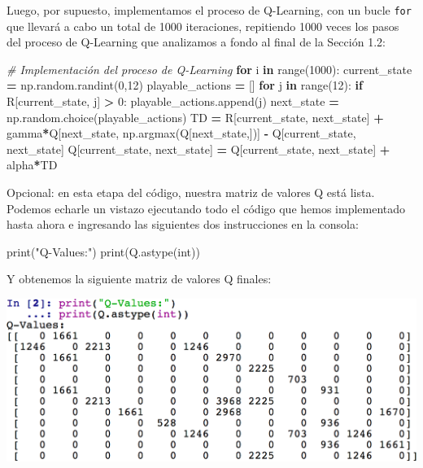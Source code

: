 \documentclass[
]{book}
\newenvironment{Shaded}{\begin{snugshade}}{\end{snugshade}}
\newcommand{\BuiltInTok}[1]{#1}
\newcommand{\CommentTok}[1]{\textcolor[rgb]{0.56,0.35,0.01}{\textit{#1}}}
\newcommand{\ControlFlowTok}[1]{\textcolor[rgb]{0.13,0.29,0.53}{\textbf{#1}}}
\newcommand{\DecValTok}[1]{\textcolor[rgb]{0.00,0.00,0.81}{#1}}
\newcommand{\KeywordTok}[1]{\textcolor[rgb]{0.13,0.29,0.53}{\textbf{#1}}}
\newcommand{\NormalTok}[1]{#1}
\newcommand{\OperatorTok}[1]{\textcolor[rgb]{0.81,0.36,0.00}{\textbf{#1}}}
\newcommand{\StringTok}[1]{\textcolor[rgb]{0.31,0.60,0.02}{#1}}
\begin{document}
Luego, por supuesto, implementamos el proceso de Q-Learning, con un bucle \texttt{for} que llevará a cabo un total de 1000 iteraciones, repitiendo 1000 veces los pasos del proceso de Q-Learning que analizamos a fondo al final de la Sección 1.2:

\begin{Shaded}
\begin{Highlighting}[]
\CommentTok{\# Implementación del proceso de Q{-}Learning}
\ControlFlowTok{for}\NormalTok{ i }\KeywordTok{in} \BuiltInTok{range}\NormalTok{(}\DecValTok{1000}\NormalTok{):}
\NormalTok{    current\_state }\OperatorTok{=}\NormalTok{ np.random.randint(}\DecValTok{0}\NormalTok{,}\DecValTok{12}\NormalTok{)}
\NormalTok{    playable\_actions }\OperatorTok{=}\NormalTok{ []}
    \ControlFlowTok{for}\NormalTok{ j }\KeywordTok{in} \BuiltInTok{range}\NormalTok{(}\DecValTok{12}\NormalTok{):}
        \ControlFlowTok{if}\NormalTok{ R[current\_state, j] }\OperatorTok{\textgreater{}} \DecValTok{0}\NormalTok{:}
\NormalTok{            playable\_actions.append(j)}
\NormalTok{    next\_state }\OperatorTok{=}\NormalTok{ np.random.choice(playable\_actions)}
\NormalTok{    TD }\OperatorTok{=}\NormalTok{ R[current\_state, next\_state] }\OperatorTok{+} 
\NormalTok{         gamma}\OperatorTok{*}\NormalTok{Q[next\_state, np.argmax(Q[next\_state,])] }\OperatorTok{{-}} 
\NormalTok{         Q[current\_state, next\_state]}
\NormalTok{    Q[current\_state, next\_state] }\OperatorTok{=}\NormalTok{ Q[current\_state, next\_state] }\OperatorTok{+}\NormalTok{ alpha}\OperatorTok{*}\NormalTok{TD}
\end{Highlighting}
\end{Shaded}

Opcional: en esta etapa del código, nuestra matriz de valores Q está lista. Podemos echarle un vistazo ejecutando todo el código que hemos implementado hasta ahora e ingresando las siguientes dos instrucciones en la consola:

\begin{Shaded}
\begin{Highlighting}[]
\BuiltInTok{print}\NormalTok{(}\StringTok{"Q{-}Values:"}\NormalTok{)}
\BuiltInTok{print}\NormalTok{(Q.astype(}\BuiltInTok{int}\NormalTok{))}
\end{Highlighting}
\end{Shaded}

Y obtenemos la siguiente matriz de valores Q finales:

\includegraphics{Images/Q_Values_Console.png}
\end{document}
